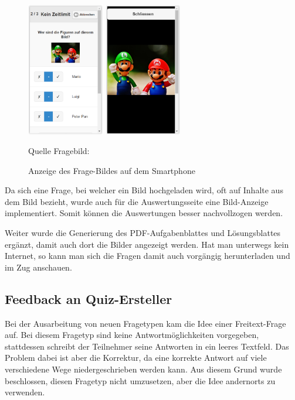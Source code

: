 \begin{figure}
	\centering
	\includegraphics[width=0.3\textwidth]{Images/Frage-Bild_Anzeige_Mobile.PNG}
	\includegraphics[width=0.3\textwidth]{Images/Frage-Bild_Anzeige_Mobile_Full.PNG}
	\caption{Anzeige des Frage-Bildes auf dem Smartphone}
	Quelle Fragebild: \cite{_bild_pixabay_mario_}
\end{figure}

Da sich eine Frage, bei welcher ein Bild hochgeladen wird, oft auf Inhalte aus dem Bild bezieht, wurde auch für die Auswertungsseite eine Bild-Anzeige implementiert. Somit können die Auswertungen besser nachvollzogen werden.

Weiter wurde die Generierung des PDF-Aufgabenblattes und Lösungsblattes ergänzt, damit auch dort die Bilder angezeigt werden. Hat man unterwegs kein Internet, so kann man sich die Fragen damit auch vorgängig herunterladen und im Zug anschauen.








\newpage
\subsection{Feedback an Quiz-Ersteller}
Bei der Ausarbeitung von neuen Fragetypen kam die Idee einer Freitext-Frage auf. Bei diesem Fragetyp sind keine Antwortmöglichkeiten vorgegeben, stattdessen schreibt der Teilnehmer seine Antworten in ein leeres Textfeld. Das Problem dabei ist aber die Korrektur, da eine korrekte Antwort auf viele verschiedene Wege niedergeschrieben werden kann. Aus diesem Grund wurde beschlossen, diesen Fragetyp nicht umzusetzen, aber die Idee andernorts zu verwenden.

